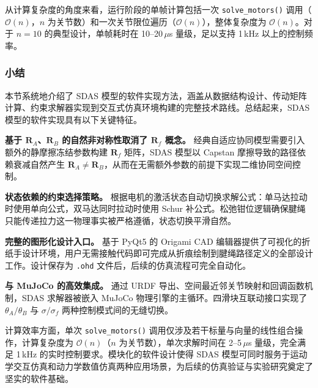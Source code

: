从计算复杂度的角度来看，运行阶段的单帧计算包括一次 \texttt{solve\_motors()} 调用（$\mathcal{O}(n)$，$n$ 为关节数）和一次关节限位遍历（$\mathcal{O}(n)$），整体复杂度为 $\mathcal{O}(n)$。对于 $n=10$ 的典型设计，单帧耗时在 10--20\,$\mu$s 量级，足以支持 1\,kHz 以上的控制频率。

\subsubsection{小结}
\label{sec:summary}

本节系统地介绍了 SDAS 模型的软件实现方法，涵盖从数据结构设计、传动矩阵计算、约束求解器实现到交互式仿真环境构建的完整技术路线。总结起来，SDAS 模型的软件实现具有以下关键特征。

\textbf{基于 $\mathbf{R}_A$、$\mathbf{R}_B$ 的自然非对称性取消了 $\mathbf{R}_f$ 概念。} 经典自适应协同模型需要引入额外的静摩擦冻结参数构建 $\mathbf{R}_f$ 矩阵，SDAS 模型以 Capstan 摩擦导致的路径依赖衰减自然产生 $\mathbf{R}_A \neq \mathbf{R}_B$，从而在无需额外参数的前提下实现二维协同空间控制。

\textbf{状态依赖的约束选择策略。} 根据电机的激活状态自动切换求解公式：单马达拉动时使用单向公式，双马达同时拉动时使用 Schur 补公式。松弛钳位逻辑确保腱绳只能传递拉力这一物理事实被严格遵循，状态切换平滑自然。

\textbf{完整的图形化设计入口。} 基于 PyQt5 的 Origami CAD 编辑器提供了可视化的折纸手设计环境，用户无需接触代码即可完成从折痕绘制到腱绳路径定义的全部设计工作。设计保存为 \texttt{.ohd} 文件后，后续的仿真流程可完全自动化。

\textbf{与 MuJoCo 的高效集成。} 通过 URDF 导出、空间最近邻关节映射和回调函数机制，SDAS 求解器被嵌入 MuJoCo 物理引擎的主循环。四滑块互联动接口实现了 $\theta_A/\theta_B$ 与 $\sigma/\sigma_f$ 两种控制模式间的无缝切换。

计算效率方面，单次 \texttt{solve\_motors()} 调用仅涉及若干标量与向量的线性组合操作，计算复杂度为 $\mathcal{O}(n)$（$n$ 为关节数），单次求解时间在 2--5\,$\mu$s 量级，完全满足 1\,kHz 的实时控制要求。模块化的软件设计使得 SDAS 模型可同时服务于运动学交互仿真和动力学数值仿真两种应用场景，为后续的仿真验证与实验研究奠定了坚实的软件基础。

